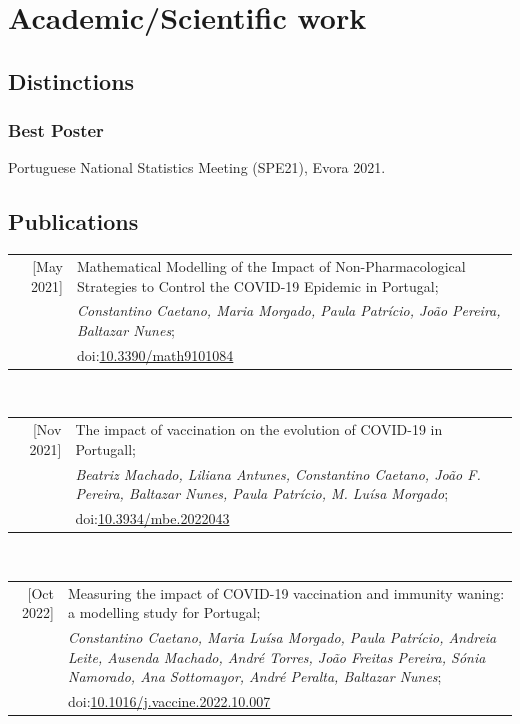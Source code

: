 \documentclass[11pt,oneside,a4paper,titlepage]{article}
\begin{document}
\section{Academic/Scientific work}

\subsection{  Distinctions}
\vspace{-2mm}
\subsubsection{Best Poster}
Portuguese National Statistics Meeting (SPE21), Evora 2021.

%
\subsection{  Publications}
\vspace{-2mm}
\begin{tabular}{N P}
[May 2021] & Mathematical Modelling of the Impact of Non-Pharmacological Strategies to Control the COVID-19 Epidemic in Portugal;\\
& \textit{Constantino Caetano, Maria Morgado, Paula Patrício, João Pereira, Baltazar Nunes};\\
& doi:\href{https://doi.org/10.3390/math9101084}{10.3390/math9101084}\\
\end{tabular}
\\
\begin{tabular}{N P}
[Nov 2021] & The impact of vaccination on the evolution of COVID-19 in Portugall;\\
& \textit{Beatriz Machado, Liliana Antunes, Constantino Caetano, João F. Pereira, Baltazar Nunes, Paula Patrício, M. Luísa Morgado};\\
& doi:\href{https://doi.org/10.3934/mbe.2022043}{10.3934/mbe.2022043}\\
\end{tabular}
\\
\begin{tabular}{N P}
[Oct 2022] & Measuring the impact of COVID-19 vaccination and immunity waning: a modelling study for Portugal;\\
& \textit{Constantino Caetano, Maria Luísa Morgado, Paula Patrício, Andreia Leite, Ausenda Machado, André Torres, João Freitas Pereira, Sónia Namorado, Ana Sottomayor, André Peralta, Baltazar Nunes};\\
& doi:\href{https://doi.org/10.1016/j.vaccine.2022.10.007}{10.1016/j.vaccine.2022.10.007}\\
\end{tabular}
\end{document}
